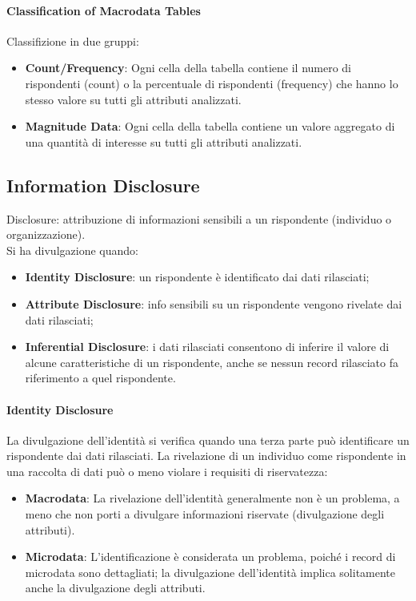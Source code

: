 \documentclass{report}
\begin{document}
\paragraph{Classification of Macrodata Tables}
Classifizione in due gruppi:
\begin{itemize}
    \item \textbf{Count/Frequency}: Ogni cella della tabella contiene il numero di rispondenti (count) o la percentuale di rispondenti (frequency) che hanno lo stesso valore su tutti gli attributi analizzati.
    \item \textbf{Magnitude Data}: Ogni cella della tabella contiene un valore aggregato di una quantità di interesse su tutti gli attributi analizzati.
\end{itemize}

\subsection{Information Disclosure}
Disclosure: attribuzione di informazioni sensibili a un rispondente (individuo o organizzazione). \\
Si ha divulgazione quando:
\begin{itemize}
    \item \textbf{Identity Disclosure}: un rispondente è identificato dai dati rilasciati;
    \item \textbf{Attribute Disclosure}: info sensibili su un rispondente vengono rivelate dai dati rilasciati;
    \item \textbf{Inferential Disclosure}: i dati rilasciati consentono di inferire il valore di alcune caratteristiche di un rispondente, anche se nessun record rilasciato fa riferimento a quel rispondente.
\end{itemize}

\paragraph{Identity Disclosure}
La divulgazione dell'identità si verifica quando una terza parte può identificare un rispondente dai dati rilasciati. 
La rivelazione di un individuo come rispondente in una raccolta di dati può o meno violare i requisiti di riservatezza:
\begin{itemize}
    \item \textbf{Macrodata}: La rivelazione dell'identità generalmente non è un problema, a meno che non porti a divulgare informazioni riservate (divulgazione degli attributi).
    \item \textbf{Microdata}: L'identificazione è considerata un problema, poiché i record di microdata sono dettagliati; la divulgazione dell'identità implica solitamente anche la divulgazione degli attributi.
\end{itemize}
\end{document}
